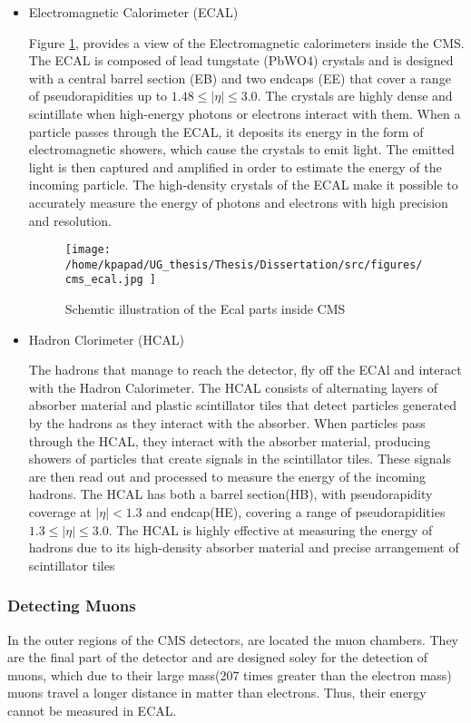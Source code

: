 \begin{itemize}
\item Electromagnetic Calorimeter (ECAL)
\label{sec:org54126fa}

Figure \ref{fig:cms_ecal}\cite{mac-2014}, provides a view of the Electromagnetic calorimeters inside the CMS. The ECAL is composed of lead tungstate (PbWO4) crystals and is designed with a central barrel section (EB) and two endcaps (EE) that cover a range of pseudorapidities up to \(1.48\leq|\eta| \leq 3.0\)\cite{Biino_2015}. The crystals are highly dense and scintillate when high-energy photons or electrons interact with them. When a particle passes through the ECAL, it deposits its energy in the form of electromagnetic showers, which cause the crystals to emit light. The emitted light is then captured and amplified in order to estimate the energy of the incoming particle. The high-density crystals of the ECAL make it possible to accurately measure the energy of photons and electrons with high precision and resolution. 

\begin{figure}[h]
\centering
\texttt{[image: /home/kpapad/UG\_thesis/Thesis/Dissertation/src/figures/cms\_ecal.jpg ]}
\caption{Schemtic illustration of the Ecal parts inside CMS }
\label{fig:cms_ecal}
\end{figure}


\item Hadron Clorimeter (HCAL)
\label{sec:orgbfeffb5}

The hadrons that manage to reach the detector, fly off the ECAl and interact with the Hadron Calorimeter. The HCAL consists of alternating layers of absorber material and plastic scintillator tiles that detect particles generated by the hadrons as they interact with the absorber.  When particles pass through the HCAL, they interact with the absorber material, producing showers of particles that create signals in the scintillator tiles. These signals are then read out and processed to measure the energy of the incoming hadrons. The HCAL has both a barrel section(HB), with pseudorapidity coverage at \(|\eta|<1.3\) and endcap(HE), covering a range of pseudorapidities \(1.3\leq|\eta| \leq 3.0\). The HCAL is highly effective at measuring the energy of hadrons due to its high-density absorber material and precise arrangement of scintillator tiles\cite{HcalLecture}
\end{itemize}

\subsubsection{Detecting Muons}
\label{sec:org8c95f86}
In the outer regions of the CMS detectors, are located the muon chambers. They are the final part of the detector and are designed soley for the detection of muons, which due to their large mass(207 times greater than the electron mass) muons travel a longer distance in matter than electrons. Thus, their energy cannot be measured in ECAL. 

